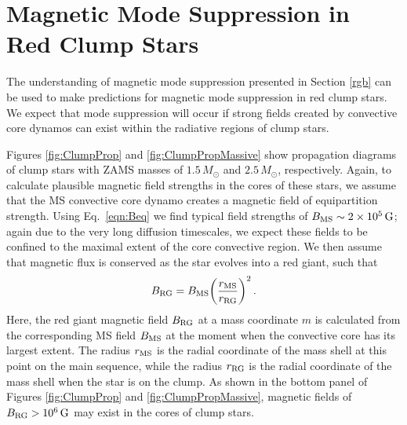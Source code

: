 \section{Magnetic Mode Suppression in Red Clump Stars}

The understanding of magnetic mode suppression presented in Section \ref{rgb} can be used to make predictions for magnetic mode suppression in red clump stars. We expect that mode suppression will occur if strong fields created by convective core dynamos can exist within the radiative regions of clump stars. 


Figures \ref{fig:ClumpProp} and \ref{fig:ClumpPropMassive} show propagation diagrams of clump stars with ZAMS masses of $1.5 \, M_\odot$ and $2.5 \, M_\odot$, respectively. 
Again, to calculate plausible magnetic field strengths in the cores of these stars, we assume that the MS convective core dynamo creates a magnetic field of equipartition strength.
Using Eq.~\ref{eqn:Beq} we find typical field strengths of $B_{\rm MS} \sim 2 \times 10^5 \, {\rm G}$; again due to the very long diffusion timescales, we expect these fields to be confined to the maximal extent of the core convective region. We then assume that magnetic flux is conserved as the star evolves into a red giant, such that
\begin{equation}
\label{eqn:Brgb}
B_{\rm RG} = B_{\rm MS} \bigg( \frac{r_{\rm MS}}{r_{\rm RG}} \bigg)^2 \, .
\end{equation}
Here, the red giant magnetic field $B_{\rm RG}$ at a mass coordinate $m$ is calculated from the corresponding MS field $B_{\rm MS}$ at the moment when the convective core has its largest extent. The radius $r_{\rm MS}$ is the radial coordinate of the mass shell at this point on the main sequence, while the radius $r_{\rm RG}$ is the radial coordinate of the mass shell when the star is on the clump. As shown in the bottom panel of Figures \ref{fig:ClumpProp} and \ref{fig:ClumpPropMassive}, magnetic fields of $B_{\rm RG} > 10^6 \, {\rm G}$ may exist in the cores of clump stars. 

